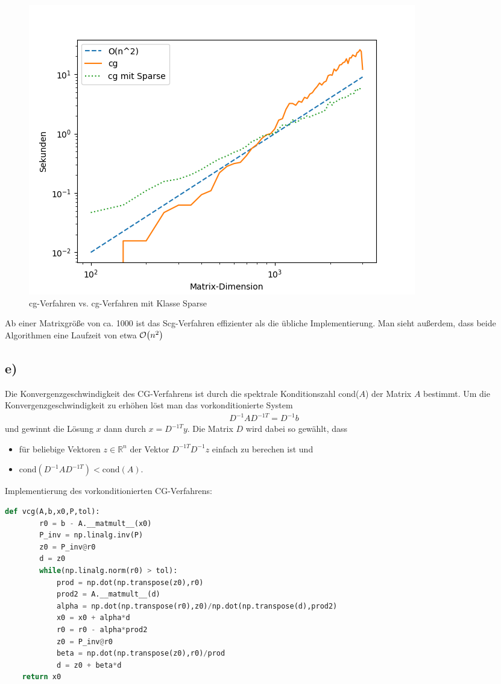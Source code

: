 \begin{figure}
    \centering
    \includegraphics[width=\linewidth]{Aufgabe_1/Cg_Scg.png}
    \caption{cg-Verfahren vs. cg-Verfahren mit Klasse Sparse}
    \label{fig:my_label}
\end{figure}
\FloatBarrier

Ab einer Matrixgröße von ca. 1000 ist das Scg-Verfahren effizienter als die übliche Implementierung.
Man sieht außerdem, dass beide Algorithmen eine Laufzeit von etwa $\mathcal{O} {\left ( n^2 \right )}$
\subsection*{e)}
Die Konvergenzgeschwindigkeit des CG-Verfahrens ist durch die spektrale Konditionszahl cond($A$) der Matrix $A$ bestimmt.
Um die Konvergenzgeschwindigkeit zu erhöhen löst man das vorkonditionierte System
\begin{align*}
  D^{-1}AD^{-1T} = D^{-1}b
\end{align*}
und gewinnt die Lösung $x$ dann durch $x = D^{-1T}y$. Die Matrix $D$ wird dabei so gewählt, dass
\begin{itemize}
\item für beliebige Vektoren $z \in \mathbb{R}^n$ der Vektor $D^{-1T}D^{-1}z$ einfach zu berechen ist und
\item $\text{cond}(D^{-1}AD^{-1T}) < \text{cond}(A)$.
\end{itemize}
Implementierung des vorkonditionierten CG-Verfahrens:
\begin{lstlisting}[language=Python]
    def vcg(A,b,x0,P,tol):
        r0 = b - A.__matmult__(x0)
        P_inv = np.linalg.inv(P)
        z0 = P_inv@r0
        d = z0
        while(np.linalg.norm(r0) > tol):
            prod = np.dot(np.transpose(z0),r0)
            prod2 = A.__matmult__(d)
            alpha = np.dot(np.transpose(r0),z0)/np.dot(np.transpose(d),prod2)
            x0 = x0 + alpha*d
            r0 = r0 - alpha*prod2
            z0 = P_inv@r0
            beta = np.dot(np.transpose(z0),r0)/prod
            d = z0 + beta*d
    return x0
\end{lstlisting}


